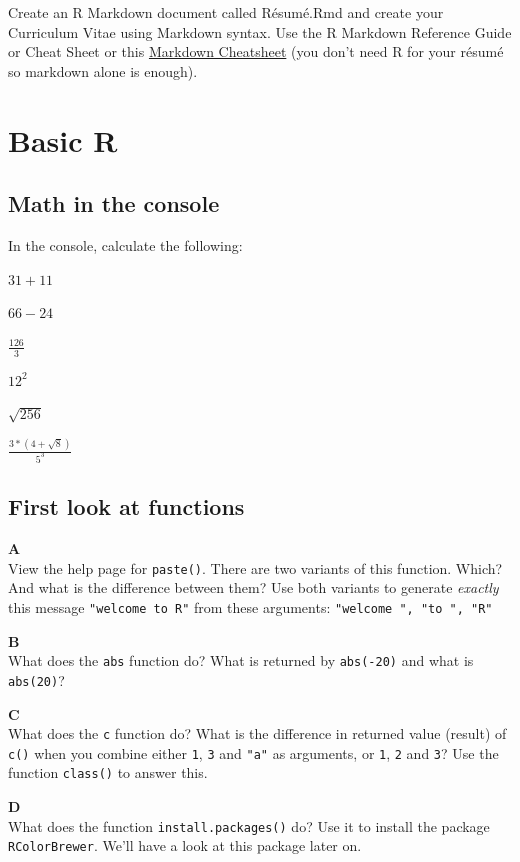 \documentclass[]{book}
\begin{document}
Create an R Markdown document called Résumé.Rmd and create your Curriculum Vitae using Markdown syntax. Use the R Markdown Reference Guide or Cheat Sheet or this \href{https://guides.github.com/pdfs/markdown-cheatsheet-online.pdf}{Markdown Cheatsheet} (you don't need R for your résumé so markdown alone is enough).

\hypertarget{basic-r}{%
\section{Basic R}\label{basic-r}}

\hypertarget{math-in-the-console}{%
\subsection{Math in the console}\label{math-in-the-console}}

In the console, calculate the following:

\(31 + 11\)

\(66 - 24\)

\(\frac{126}{3}\)

\(12^2\)

\(\sqrt{256}\)

\(\frac{3*(4+\sqrt{8})}{5^3}\)

\hypertarget{first-look-at-functions}{%
\subsection{First look at functions}\label{first-look-at-functions}}

\textbf{A}\\
View the help page for \texttt{paste()}. There are two variants of this function. Which? And what is the difference between them? Use both variants to generate \emph{exactly} this message \texttt{"welcome\ to\ R"} from these arguments: \texttt{"welcome\ ",\ "to\ ",\ "R"}

\textbf{B}\\
What does the \texttt{abs} function do? What is returned by \texttt{abs(-20)} and what is \texttt{abs(20)}?

\textbf{C}\\
What does the \texttt{c} function do? What is the difference in returned value (result) of \texttt{c()} when you combine either \texttt{1}, \texttt{3} and \texttt{"a"} as arguments, or \texttt{1}, \texttt{2} and \texttt{3}? Use the function \texttt{class()} to answer this.

\textbf{D}\\
What does the function \texttt{install.packages()} do? Use it to install the package \texttt{RColorBrewer}. We'll have a look at this package later on.
\end{document}
